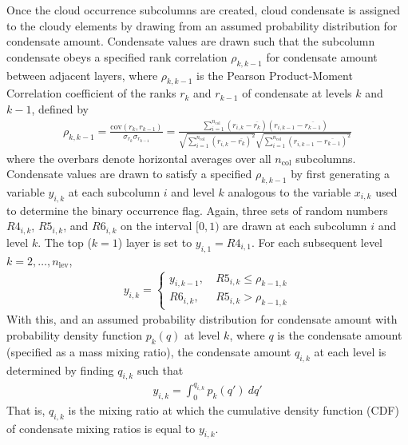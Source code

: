 Once the cloud occurrence subcolumns are created, cloud condensate is
assigned to the cloudy elements by drawing from an assumed probability
distribution for condensate amount. Condensate values are drawn such
that the subcolumn condensate obeys a specified rank correlation
\(\rho_{k, k-1}\) for condensate amount between adjacent layers, where
\(\rho_{k, k-1}\) is the Pearson Product-Moment Correlation coefficient
of the ranks \(r_{k}\) and \(r_{k-1}\) of condensate at levels \(k\) and
\(k-1\), defined by \[\begin{gathered}
    \rho_{k, k-1} = \frac{
        \textrm{cov}(r_{k}, r_{k-1})
    }{
        \sigma_{r_{k}} \sigma_{r_{k-1}}
    } = \frac{
        \sum_{i=1}^{n_\textrm{col}} (r_{i, k} - \overline{r_{k}})(r_{i, k-1} - \overline{r_{k-1}})
    }{
        \sqrt{\sum_{i=1}^{n_\textrm{col}} (r_{i, k} - \overline{r_{k}})^2}
        \sqrt{\sum_{i=1}^{n_\textrm{col}} (r_{i, k-1} - \overline{r_{k-1}})^2}
    }
    \label{rankcorr_equation}\end{gathered}\] where the overbars denote
horizontal averages over all \(n_\textrm{col}\) subcolumns. Condensate
values are drawn to satisfy a specified \(\rho_{k, k-1}\) by first
generating a variable \(y_{i, k}\) at each subcolumn \(i\) and level
\(k\) analogous to the variable \(x_{i, k}\) used to determine the
binary occurrence flag. Again, three sets of random numbers
\(R4_{i, k}\), \(R5_{i, k}\), and \(R6_{i, k}\) on the interval
\([0, 1)\) are drawn at each subcolumn \(i\) and level \(k\). The top
(\(k = 1\)) layer is set to \(y_{i, 1} = R4_{i, 1}\). For each
subsequent level \(k = 2, \ldots, n_\textrm{lev}\), \[\begin{gathered}
    y_{i, k} = \begin{cases}
        y_{i, k-1}, ~ & R5_{i, k} \le \rho_{k-1, k} \\
        R6_{i, k},  ~ & R5_{i, k} > \rho_{k-1, k}
    \end{cases}\end{gathered}\] With this, and an assumed probability
distribution for condensate amount with probability density function
\(p_k(q)\) at level \(k\), where \(q\) is the condensate amount
(specified as a mass mixing ratio), the condensate amount \(q_{i, k}\)
at each level is determined by finding \(q_{i, k}\) such that
\[\begin{gathered}
    y_{i, k} = \int_0^{q_{i, k}} p_{k}(q') ~dq'\end{gathered}\] That is,
\(q_{i, k}\) is the mixing ratio at which the cumulative density
function (CDF) of condensate mixing ratios is equal to \(y_{i, k}\).

